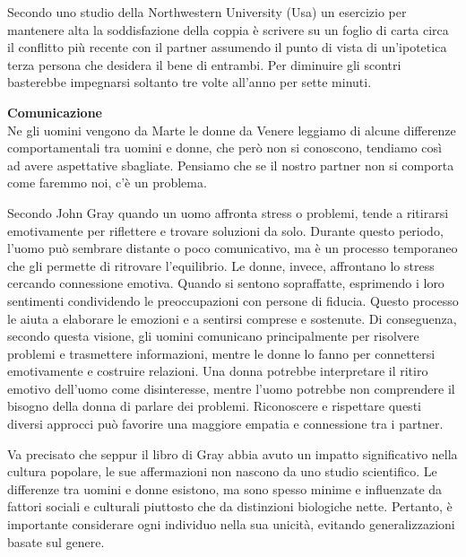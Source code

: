 \documentclass[12pt]{book} %
\begin{document}
\begin{mdframed}[linewidth=1pt]
Secondo uno studio della Northwestern University (Usa) un esercizio per mantenere alta la soddisfazione della coppia è
scrivere su un foglio di carta circa il conflitto più recente con il partner assumendo il punto di vista di
un'ipotetica terza persona che desidera il bene di entrambi. Per diminuire gli scontri basterebbe impegnarsi soltanto
tre volte all'anno per sette
minuti.
\end{mdframed}

\noindent \textbf{\large Comunicazione} \\
Ne gli uomini vengono da Marte le donne da
Venere leggiamo di alcune
differenze comportamentali tra uomini e donne, che però non si conoscono, tendiamo così ad avere aspettative sbagliate.
Pensiamo che se il nostro partner non si comporta come faremmo noi, c'è un problema. 

Secondo John Gray quando un uomo affronta stress o problemi, tende a ritirarsi emotivamente per riflettere e trovare soluzioni da solo. Durante questo periodo, l'uomo può sembrare distante o poco comunicativo, ma è un processo temporaneo che gli permette di ritrovare l'equilibrio. Le donne, invece, affrontano lo stress cercando connessione emotiva. Quando si sentono sopraffatte, esprimendo i loro sentimenti condividendo le preoccupazioni con persone di fiducia. Questo processo le aiuta a elaborare le emozioni e a sentirsi comprese e sostenute.
Di conseguenza, secondo questa visione, gli uomini comunicano principalmente per risolvere problemi e trasmettere informazioni, mentre le donne lo fanno per connettersi emotivamente e costruire relazioni.
Una donna potrebbe interpretare il ritiro emotivo dell'uomo come disinteresse, mentre l'uomo potrebbe non comprendere il bisogno della donna di parlare dei problemi. Riconoscere e rispettare questi diversi approcci può favorire una maggiore empatia e connessione tra i partner.

Va precisato che seppur il libro di Gray abbia avuto un impatto significativo nella cultura popolare, le sue affermazioni non nascono da uno studio scientifico. Le differenze tra uomini e donne esistono, ma sono spesso minime e influenzate da fattori sociali e culturali piuttosto che da distinzioni biologiche nette. Pertanto, è importante considerare ogni individuo nella sua unicità, evitando generalizzazioni basate sul genere.
\end{document}
